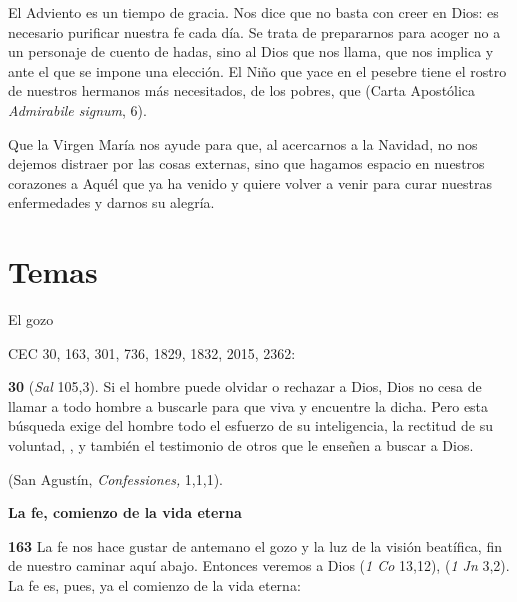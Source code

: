 \begin{body}
\begin{body}
El Adviento es un tiempo de gracia. Nos dice que no basta con creer en Dios: es necesario purificar nuestra fe cada día. Se trata de prepararnos para acoger no a un personaje de cuento de hadas, sino al Dios que nos llama, que nos implica y ante el que se impone una elección. El Niño que yace en el pesebre tiene el rostro de nuestros hermanos más necesitados, de los pobres, que  (Carta Apostólica \emph{Admirabile signum}, 6).

Que la Virgen María nos ayude para que, al acercarnos a la Navidad, no nos dejemos distraer por las cosas externas, sino que hagamos espacio en nuestros corazones a Aquél que ya ha venido y quiere volver a venir para curar nuestras enfermedades y darnos su alegría.



\section{Temas}

El gozo

CEC 30, 163, 301, 736, 1829, 1832, 2015, 2362:

\textbf{30}  (\emph{Sal} 105,3). Si el hombre puede olvidar o rechazar a Dios, Dios no cesa de llamar a todo hombre a buscarle para que viva y encuentre la dicha. Pero esta búsqueda exige del hombre todo el esfuerzo de su inteligencia, la rectitud de su voluntad, , y también el testimonio de otros que le enseñen a buscar a Dios.

 (San Agustín, \emph{Confessiones,} 1,1,1).

\textbf{La fe, comienzo de la vida eterna}

\textbf{163} La fe nos hace gustar de antemano el gozo y la luz de la visión beatífica, fin de nuestro caminar aquí abajo. Entonces veremos a Dios  (\emph{1 Co} 13,12),  (\emph{1 Jn} 3,2). La fe es, pues, ya el comienzo de la vida eterna:


\end{body}
\end{body}
